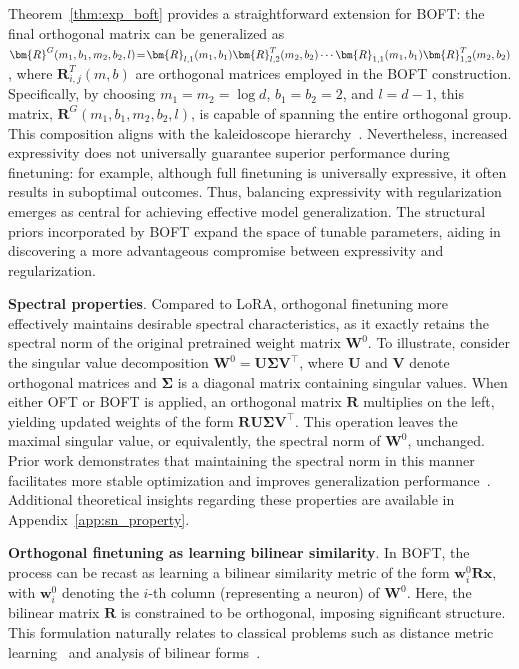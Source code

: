 Theorem~\ref{thm:exp_boft} provides a straightforward extension for BOFT: the final orthogonal matrix can be generalized as $\thickmuskip=2mu \medmuskip=2mu \bm{R}^G(m_1,b_1,m_2,b_2,l)=\bm{R}_{l,1}(m_1,b_1)\bm{R}_{l,2}^T(m_2,b_2)\cdots\bm{R}_{1,1}(m_1,b_1)\bm{R}_{1,2}^T(m_2,b_2)$, where $\bm{R}_{i,j}^T(m,b)$ are orthogonal matrices employed in the BOFT construction. Specifically, by choosing $m_1=m_2=\log d$, $b_1=b_2=2$, and $l=d-1$, this matrix, $\bm{R}^G(m_1,b_1,m_2,b_2,l)$, is capable of spanning the entire orthogonal group. This composition aligns with the kaleidoscope hierarchy~\cite{dao2019kaleidoscope}. Nevertheless, increased expressivity does not universally guarantee superior performance during finetuning: for example, although full finetuning is universally expressive, it often results in suboptimal outcomes. Thus, balancing expressivity with regularization emerges as central for achieving effective model generalization. The structural priors incorporated by BOFT expand the space of tunable parameters, aiding in discovering a more advantageous compromise between expressivity and regularization.

\textbf{Spectral properties}. Compared to LoRA, orthogonal finetuning more effectively maintains desirable spectral characteristics, as it exactly retains the spectral norm of the original pretrained weight matrix $\bm{W}^0$. To illustrate, consider the singular value decomposition $\bm{W}^0 = \bm{U}\bm{\Sigma}\bm{V}^\top$, where $\bm{U}$ and $\bm{V}$ denote orthogonal matrices and $\bm{\Sigma}$ is a diagonal matrix containing singular values. When either OFT or BOFT is applied, an orthogonal matrix $\bm{R}$ multiplies on the left, yielding updated weights of the form $\bm{R}\bm{U}\bm{\Sigma}\bm{V}^\top$. This operation leaves the maximal singular value, or equivalently, the spectral norm of $\bm{W}^0$, unchanged. Prior work demonstrates that maintaining the spectral norm in this manner facilitates more stable optimization and improves generalization performance~\cite{miyato2018spectral,yoshida2017spectral}. Additional theoretical insights regarding these properties are available in Appendix~\ref{app:sn_property}.

\textbf{Orthogonal finetuning as learning bilinear similarity}. In BOFT, the process can be recast as learning a bilinear similarity metric of the form $\bm{w}^0_i\bm{R}\bm{x}$, with $\bm{w}^0_i$ denoting the $i$-th column (representing a neuron) of $\bm{W}^0$. Here, the bilinear matrix $\bm{R}$ is constrained to be orthogonal, imposing significant structure. This formulation naturally relates to classical problems such as distance metric learning~\cite{xing2002distance} and analysis of bilinear forms~\cite{roman2005advanced}.

